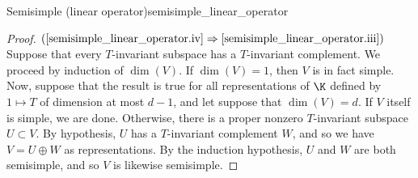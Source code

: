 \begin{thm}{Semisimple (linear operator)}{semisimple_linear_operator}
\begin{proof}
		\blankline
		\noindent
		$(\cref{semisimple_linear_operator.iv}\Rightarrow \cref{semisimple_linear_operator.iii})$ Suppose that every $T$-invariant subspace has a $T$-invariant complement.  We proceed by induction of $\dim (V)$.  If $\dim (V)=1$, then $V$ is in fact simple.  Now, suppose that the result is true for all representations of $\K$ defined by $1\mapsto T$ of dimension at most $d-1$, and let suppose that $\dim (V)=d$.  If $V$ itself is simple, we are done.  Otherwise, there is a proper nonzero $T$-invariant subspace $U\subset V$.  By hypothesis, $U$ has a $T$-invariant complement $W$, and so we have $V=U\oplus W$ as representations.  By the induction hypothesis, $U$ and $W$ are both semisimple, and so $V$ is likewise semisimple.
	\end{proof}
\end{thm}